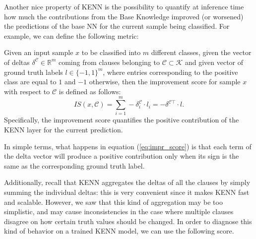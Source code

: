 Another nice property of KENN is the possibility to quantify at inference time how much the contributions from the Base Knowledge improved (or worsened) the predictions of the base NN for the current sample being classified. For example, we can define the following metric:
\begin{definition}
	Given an input sample $x$ to be classified into $m$ different classes, given the vector of deltas $\delta^{\mathcal{C}} \in \mathbb{R}^m$ coming from clauses belonging to $\mathcal{C} \subset \mathcal{K}$ and given vector of ground truth labels $l \in \{-1,1\}^m$, where entries corresponding to the positive class are equal to $1$ and $-1$ otherwise, then the improvement score for sample $x$ with respect to $\mathcal{C}$ is defined as follows:
	\begin{equation}
	\label{eq:impr_score}
	IS(x,\mathcal{C})=\sum_{i=1}^m -\delta^{\mathcal{C}}_i \cdot  l_i =  -\delta^{\mathcal{C}\top} \cdot  l.
	\end{equation}
	Specifically, the improvement score quantifies the positive contribution of the KENN layer for the current prediction.
\end{definition}
In simple terms, what happens in equation (\ref{eq:impr_score}) is that each term of the delta vector will produce a positive contribution only when its sign is the same as the corresponding ground truth label.

Additionally, recall that KENN aggregates the deltas of all the clauses by simply summing the individual deltas: this is very convenient since it makes KENN fast and scalable. However, we saw that this kind of aggregation may be too simplistic, and may cause inconsistencies in the case where multiple clauses disagree on how certain truth values should be changed. In order to diagnose this kind of behavior on a trained KENN model, we can use the following score.


